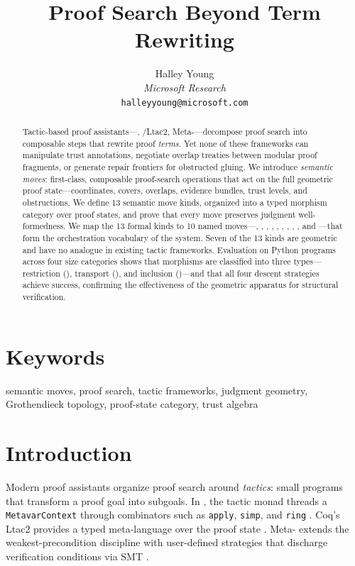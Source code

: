 \documentclass[11pt]{article}
\title{\textbf{Proof Search Beyond Term Rewriting}}
\author{%
  Halley Young\\
  \textit{Microsoft Research}\\
  \texttt{halleyyoung@microsoft.com}
}
\date{}
\begin{document}
\maketitle

\begin{abstract}
Tactic-based proof assistants---\LEAN, \Coq{}/Ltac2, Meta-\Fstar---decompose
proof search into composable steps that rewrite proof \emph{terms}.  Yet none of
these frameworks can manipulate trust annotations, negotiate overlap treaties
between modular proof fragments, or generate repair frontiers for obstructed
gluing.  We introduce \emph{semantic moves}: first-class, composable
proof-search operations that act on the full geometric proof state---coordinates,
covers, overlaps, evidence bundles, trust levels, and obstructions.  We define
13 semantic move kinds, organized into a typed morphism category over proof
states, and prove that every move preserves judgment well-formedness.
We map the 13 formal kinds to 10 named moves---\VERIFY, \CONSTRUCT,
\NORMALIZE, \GLUE, \RESTRICT, \TRANSPORT, \REPAIR, \PROMOTE,
\CHALLENGE, and \ESCALATE---that form the orchestration vocabulary of
the \JuGeo{} system.  Seven of the 13 kinds are geometric and have no
analogue in existing tactic frameworks.
Evaluation on \compTotalPrograms{} Python programs across four size categories
shows that \compMorphTotal{} morphisms are classified into three types---restriction
(\compMorphRestrictionPct), transport (\compMorphTransportPct), and inclusion
(\compMorphInclusionPct)---and that all four descent strategies
achieve \compDescentEagerRate{} success, confirming the effectiveness
of the geometric apparatus for structural verification.
\end{abstract}

\section*{Keywords}
semantic moves, proof search, tactic frameworks, judgment geometry,
Grothendieck topology, proof-state category, trust algebra

\section{Introduction}\label{sec:intro}

Modern proof assistants organize proof search around \emph{tactics}:
small programs that transform a proof goal into subgoals.  In \LEAN,
the tactic monad threads a \texttt{MetavarContext} through combinators
such as \texttt{apply}, \texttt{simp}, and \texttt{ring}
\cite{deMoura2021Lean4,Avigad2023Hitchhiker}.  Coq's Ltac2
provides a typed meta-language over the proof state
\cite{Pedrot2019Ltac2}.  Meta-\Fstar{} extends the weakest-precondition
discipline with user-defined strategies that discharge verification
conditions via SMT \cite{MartinezEtAl2019MetaFStar}.
\end{document}
